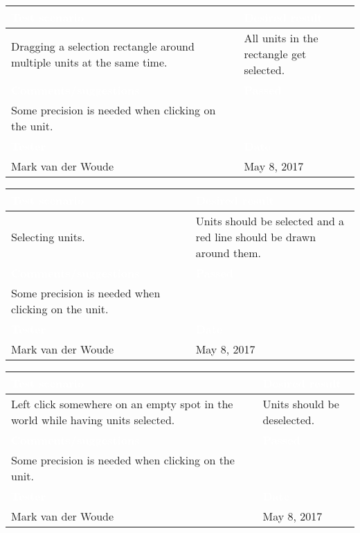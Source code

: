 \begin{tabularx}{\textwidth}{|X|X|}
\hline
\rowcolor{lightgray}\textcolor{white}{\textbf{Test scenario}} &
\textcolor{white}{\textbf{Desired result}}       
\\\hline
Dragging a selection rectangle around multiple units at the same time. & All units in the rectangle get selected.   
\\\hline
\rowcolor{lightgray}\textcolor{white}{\textbf{Comments/suggestions}} & 
\textcolor{white}{\textbf{Passed}}
\\\hline
Some precision is needed when clicking on the unit. & \cellcolor{green}                      
\\\hline
\rowcolor{lightgray}\textcolor{white}{\textbf{Tester}} & 
\textcolor{white}{\textbf{Date}}               
\\\hline
Mark van der Woude & May 8, 2017                               		 
\\\hline
\end{tabularx}


\begin{tabularx}{\textwidth}{|X|X|}
\hline
\rowcolor{lightgray}\textcolor{white}{\textbf{Test scenario}} &
\textcolor{white}{\textbf{Desired result}}       
\\\hline
Selecting units. & Units should be selected and a red line should be drawn around them.  
\\\hline
\rowcolor{lightgray}\textcolor{white}{\textbf{Comments/suggestions}} & 
\textcolor{white}{\textbf{Passed}}
\\\hline
Some precision is needed when clicking on the unit. & \cellcolor{green}                      
\\\hline
\rowcolor{lightgray}\textcolor{white}{\textbf{Tester}} &
\textcolor{white}{\textbf{Date}}               
\\\hline
Mark van der Woude & May 8, 2017                               		 
\\\hline
\end{tabularx}


\begin{tabularx}{\textwidth}{|X|X|}
\hline
\rowcolor{lightgray}\textcolor{white}{\textbf{Test scenario}} &
\textcolor{white}{\textbf{Desired result}}       
\\\hline
Left click somewhere on an empty spot in the world while having units selected. & Units should be deselected.  
\\\hline
\rowcolor{lightgray}\textcolor{white}{\textbf{Comments/suggestions}} & 
\textcolor{white}{\textbf{Passed}}
\\\hline
Some precision is needed when clicking on the unit. & \cellcolor{green}                      
\\\hline
\rowcolor{lightgray}\textcolor{white}{\textbf{Tester}} & 
\textcolor{white}{\textbf{Date}}               
\\\hline
Mark van der Woude & May 8, 2017                               		 
\\\hline
\end{tabularx}


